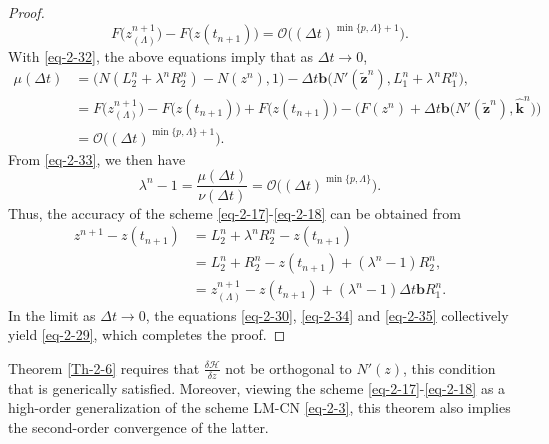\documentclass[onefignum,onetabnum]{siamart}
\begin{document}
\begin{proof}
\begin{equation*}
	F\big(z_{(\Lambda)}^{n+1}\big)-F\big(z(t_{n+1})\big)=\mathcal{O}\big((\Delta t)^{\min\{p,\Lambda\}+1}\big).
\end{equation*}
With \eqref{eq-2-32}, the above equations imply that as $\Delta t\rightarrow 0$,
\begin{equation*}
	\begin{aligned}
		\mu(\Delta t)&=\big(N(L_2^n+\lambda^nR_2^n)-N(z^n),1\big)-\Delta t\textbf{b}\big(N'(\tilde{\textbf{z}}^n),L_1^n+\lambda^nR_1^n\big),\\
		&=F\big(z_{(\Lambda)}^{n+1}\big)-F\big(z(t_{n+1})\big)+F\big(z(t_{n+1})\big)-\big(F(z^n)+\Delta t\textbf{b}\big(N'(\tilde{\textbf{z}}^n),\hat{\textbf{k}}^n\big)\big)\\
		&=\mathcal{O}\big((\Delta t)^{\min\{p,\Lambda\}+1}\big).
	\end{aligned}
\end{equation*}	
From \eqref{eq-2-33}, we then have
\begin{equation}\label{eq-2-35}
	\lambda^n-1=\frac{\mu(\Delta t)}{\nu(\Delta t)}=\mathcal{O}\big((\Delta t)^{\min\{p,\Lambda\}}\big).
\end{equation}
Thus, the accuracy of the scheme \eqref{eq-2-17}-\eqref{eq-2-18} can be obtained from
\begin{equation*}
	\begin{aligned}
		z^{n+1}-z(t_{n+1})&=L_2^n+\lambda^nR_2^n-z(t_{n+1})\\
		&=L_2^n+R_2^n-z(t_{n+1})+(\lambda^n-1)R_2^n,\\
		&=z_{(\Lambda)}^{n+1}-z(t_{n+1})+(\lambda^n-1)\Delta t\textbf{b}R_1^n.
	\end{aligned}
\end{equation*}	
In the limit as $\Delta t\rightarrow 0$, the equations \eqref{eq-2-30}, \eqref{eq-2-34} and \eqref{eq-2-35} collectively yield \eqref{eq-2-29}, which completes the proof.
\end{proof}

\begin{remark}
Theorem \ref{Th-2-6} requires that $\frac{\delta\mathcal{H}}{\delta z}$ not be orthogonal to $N'(z)$, this condition that is generically satisfied. Moreover, viewing the scheme \eqref{eq-2-17}-\eqref{eq-2-18} as a high-order generalization of the scheme LM-CN \eqref{eq-2-3}, this theorem also implies the second-order convergence of the latter.
\end{remark}
\end{document}
